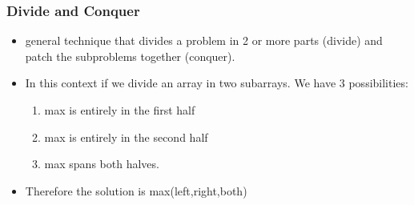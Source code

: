 \documentclass{beamer}
\begin{document}
\begin{frame}
  \frametitle{Divide and Conquer}
  \begin{itemize}
  \item general technique that divides a problem in 2 or more parts (divide) and
    patch the subproblems together (conquer).
  \item In this context if we divide an array in two subarrays. We
    have  3    possibilities:
    \begin{enumerate}
    \item max is entirely in the first half
    \item max is entirely in the second half
     \item max spans both halves.
    \end{enumerate}
\item Therefore the solution is max(left,right,both)
  \end{itemize}
\end{frame}
\end{document}
